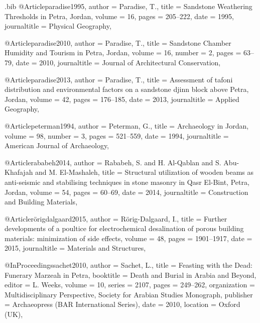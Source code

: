 \begin{filecontents}{\IJSRAidentifier.bib}
@Article{paradise1995,
  author       = {Paradise, T.},
  title        = {Sandstone Weathering Thresholds in Petra, Jordan},
  volume       = {16},
  pages        = {205--222},
  date         = {1995},
  journaltitle = {Physical Geography},
}

@Article{paradise2010,
  author       = {Paradise, T.},
  title        = {Sandstone Chamber Humidity and Tourism in Petra, Jordan},
  volume       = {16},
  number       = {2},
  pages        = {63--79},
  date         = {2010},
  journaltitle = {Journal of Architectural Conservation},
}

@Article{paradise2013,
  author       = {Paradise, T.},
  title        = {Assessment of tafoni distribution and environmental factors on a sandstone djinn block above Petra, Jordan},
  volume       = {42},
  pages        = {176--185},
  date         = {2013},
  journaltitle = {Applied Geography},
}

@Article{peterman1994,
  author       = {Peterman, G.},
  title        = {Archaeology in Jordan},
  volume       = {98},
  number       = {3},
  pages        = {521--559},
  date         = {1994},
  journaltitle = {American Journal of Archaeology},
}

@Article{rababeh2014,
  author       = {Rababeh, S. and H. Al-Qablan and S. Abu-Khafajah and M. El-Mashaleh},
  title        = {Structural utilization of wooden beams as anti-seismic and stabilising techniques in stone masonry in Qasr El-Bint, Petra, Jordan},
  volume       = {54},
  pages        = {60--69},
  date         = {2014},
  journaltitle = {Construction and Building Materials},
}

@Article{rörigdalgaard2015,
  author       = {Rörig-Dalgaard, I.},
  title        = {Further developments of a poultice for electrochemical desalination of porous building materials: minimization of side effects},
  volume       = {48},
  pages        = {1901--1917},
  date         = {2015},
  journaltitle = {Materials and Structures},
}

@InProceedings{sachet2010,
  author       = {Sachet, L.},
  title        = {Feasting with the Dead: Funerary Marzeah in Petra},
  booktitle    = {Death and Burial in Arabia and Beyond},
  editor       = {L. Weeks},
  volume       = {10},
  series       = {2107},
  pages        = {249--262},
  organization = {Multidisciplinary Perspective, Society for Arabian Studies Monograph},
  publisher    = {Archaeopress (BAR International Series)},
  date         = {2010},
  location     = {Oxford (UK)},
}


\end{filecontents}

